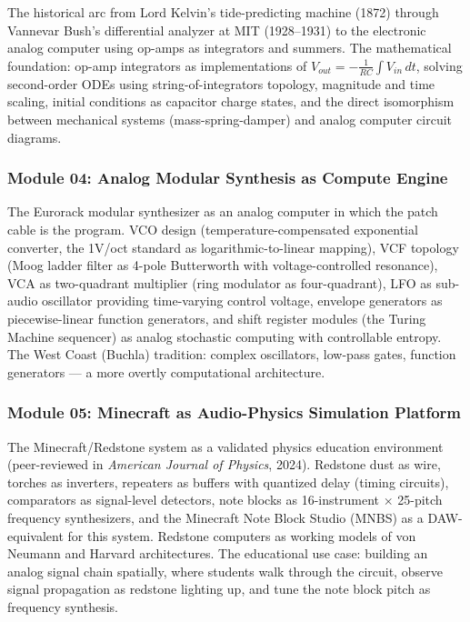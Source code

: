 \documentclass[11pt,letterpaper]{article}
\begin{document}
The historical arc from Lord Kelvin's tide-predicting machine (1872) through Vannevar Bush's differential analyzer at MIT (1928--1931) to the electronic analog computer using op-amps as integrators and summers. The mathematical foundation: op-amp integrators as implementations of $V_{out} = -\frac{1}{RC}\int V_{in}\, dt$, solving second-order ODEs using string-of-integrators topology, magnitude and time scaling, initial conditions as capacitor charge states, and the direct isomorphism between mechanical systems (mass-spring-damper) and analog computer circuit diagrams.

\subsubsection{Module 04: Analog Modular Synthesis as Compute Engine}

The Eurorack modular synthesizer as an analog computer in which the patch cable is the program. VCO design (temperature-compensated exponential converter, the 1V/oct standard as logarithmic-to-linear mapping), VCF topology (Moog ladder filter as 4-pole Butterworth with voltage-controlled resonance), VCA as two-quadrant multiplier (ring modulator as four-quadrant), LFO as sub-audio oscillator providing time-varying control voltage, envelope generators as piecewise-linear function generators, and shift register modules (the Turing Machine sequencer) as analog stochastic computing with controllable entropy. The West Coast (Buchla) tradition: complex oscillators, low-pass gates, function generators --- a more overtly computational architecture.

\subsubsection{Module 05: Minecraft as Audio-Physics Simulation Platform}

The Minecraft/Redstone system as a validated physics education environment (peer-reviewed in \textit{American Journal of Physics}, 2024). Redstone dust as wire, torches as inverters, repeaters as buffers with quantized delay (timing circuits), comparators as signal-level detectors, note blocks as 16-instrument $\times$ 25-pitch frequency synthesizers, and the Minecraft Note Block Studio (MNBS) as a DAW-equivalent for this system. Redstone computers as working models of von Neumann and Harvard architectures. The educational use case: building an analog signal chain spatially, where students walk through the circuit, observe signal propagation as redstone lighting up, and tune the note block pitch as frequency synthesis.
\end{document}
